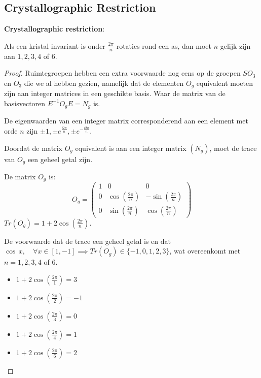 \subsection{Crystallographic Restriction}
\begin{theorem}
    \textbf{Crystallographic restriction}:

    Als een kristal invariant is onder \(\frac{2\pi }{n}\) rotaties rond een as, dan moet \(n\) gelijk zijn aan \(1, 2, 3, 4\) of \(6\).

\end{theorem}


\begin{proof}

    Ruimtegroepen hebben een extra voorwaarde nog eens op de groepen \(SO_3\) en \(O_3\) die we al hebben gezien,
    namelijk dat de elementen \(O_g\) equivalent moeten zijn aan integer matrices in een geschikte basis.
    Waar de matrix van de basisvectoren \(E^{-1}O_gE = N_g\) is.


    De eigenwaarden van een integer matrix corresponderend aan een element met orde \(n\) zijn \(\pm 1, \pm e^{\frac{i2\pi}{n}}, \pm e^{-\frac{i2\pi}{n}} \).

    Doordat de matrix \(O_g\) equivalent is aan een integer matrix \((N_g)\), moet de trace van \(O_g\) een geheel getal zijn.

    De matrix \(O_g\) is:
    \[
        O_g = \begin{pmatrix}
            1 & 0 & 0 \\
            0 & \cos(\frac{2\pi}{n}) & -\sin(\frac{2\pi}{n}) \\
            0 & \sin(\frac{2\pi}{n}) & \cos(\frac{2\pi}{n})
        \end{pmatrix}
    \]
    \(Tr (O_g) = 1 + 2\cos(\frac{2\pi}{n})\).

    De voorwaarde dat de trace een geheel getal is en dat \(\cos \,x , \quad\forall x \in [1,-1] \implies Tr(O_g) \in \{-1,0,1,2,3\} \),
    wat overeenkomt met \(n = 1, 2, 3, 4\) of \(6\).
    \begin{itemize}
        \item[\(n = 1\):] \(1 + 2\cos(\frac{2\pi}{1}) = 3\)
        \item[\(n = 2\):] \(1 + 2\cos(\frac{2\pi}{2}) = -1\)
        \item[\(n = 3\):] \(1 + 2\cos(\frac{2\pi}{3}) = 0\)
        \item[\(n = 4\):] \(1 + 2\cos(\frac{2\pi}{4}) = 1\)
        \item[\(n = 6\):] \(1 + 2\cos(\frac{2\pi}{6}) = 2\)
    \end{itemize}
\end{proof}
